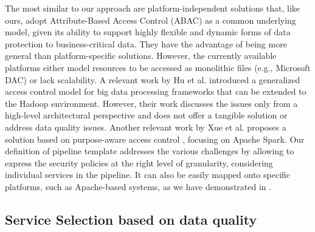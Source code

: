 The most similar to our approach are platform-independent solutions that, like ours, adopt Attribute-Based Access Control (ABAC) \cite{XACML3.0} as a common underlying model, given its ability to support highly flexible and dynamic forms of data protection to business-critical data. They have the advantage of being more general than platform-specific solutions. However, the currently available platforms either model resources to be accessed as monolithic files (e.g., Microsoft DAC) or lack scalability. A relevant work by Hu et al.  \cite{ HUFerraiolo:2014} introduced a generalized access control model for big data processing frameworks that can be extended to the Hadoop environment. However, their work discusses the issues only from a high-level architectural perspective and does not offer a tangible solution or address data quality issues. Another relevant work by Xue et al.  \cite{GuardSpark:ACSAC:2020} proposes a solution based on purpose-aware access control \cite{Byun2008}, focusing on Apache Spark. 
%
Our definition of pipeline template addresses the various challenges by allowing to express the security policies at the right level of granularity, considering individual services in the pipeline. It can also be easily mapped onto specific platforms, such as Apache-based systems, as we have demonstrated in \cite{medes2021}.

\subsection{Service Selection based on data quality}\label{sec:servicesel}


